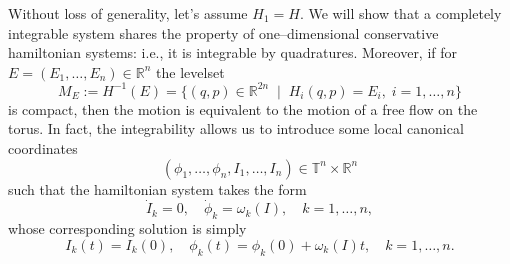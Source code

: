 \documentclass[english,fontsize=11pt,paper=b5]{scrbook}
\numberwithin{equation}{chapter}
\theoremstyle{definition}
\begin{document}
      Without loss of generality, let's assume $H_1 = H$.
      We will show that a completely integrable system shares the property of one--dimensional conservative hamiltonian systems: i.e., it is integrable by quadratures.
      Moreover, if for $E = (E_1, \ldots, E_n)\in\mathbb{R}^n$ the levelset
      \begin{equation}\label{eq:levelsetE}
        M_E := H^{-1}(E) = \big\{(q,p)\in\mathbb{R}^{2n} \;\mid\; H_i(q,p)=E_i,\;i=1,\ldots,n \big\}
      \end{equation}
      is compact, then the motion is equivalent to the motion of a free flow on the torus.
      In fact, the integrability allows us to introduce some local canonical coordinates
      \begin{equation}\label{eq:actionalngle}
        (\phi_1, \ldots, \phi_n, I_1, \ldots, I_n) \in \mathbb{T}^n\times\mathbb{R}^n
      \end{equation}
      such that the hamiltonian system takes the form
      \begin{equation}
        \dot I_k = 0, \quad \dot \phi_k = \omega_k(I), \quad k=1,\ldots,n,
      \end{equation}
      whose corresponding solution is simply
      \begin{equation}
        I_k(t)= I_k(0), \quad
        \phi_k(t) = \phi_k(0) + \omega_k(I)t, \quad k = 1,\ldots, n.
      \end{equation}
\end{document}
